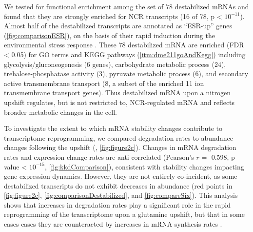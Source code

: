 We tested for
functional enrichment among the set of 78 destabilized
mRNAs and found that they are strongly enriched for NCR
transcripts (16 of 78, p < $10^{-11}$). Almost half of the
destabilized transcripts are annotated as “ESR-up” genes
(\autoref{fig:comparisonESR}), on the basis of  their rapid induction
during the environmental stress response \parencite{gasch2000genomic}. These 78
destabilized mRNA are enriched (FDR < 0.05) for GO terms and KEGG 
pathways (\autoref{itm:dme211goAndKegg}) including
glycolysis/gluconeogenesis (6 genes), 
carbohydrate metabolic process (24),
trehalose-phosphatase activity (3), 
pyruvate metabolic process (6), 
and secondary active transmembrane transport
(8, a subset of the enriched 11 ion transmembrane transport genes).
Thus destabilized mRNA upon a nitrogen upshift regulates, 
but is not restricted to, NCR-regulated mRNA and reflects broader
metabolic changes in the cell. 




To investigate the extent to which mRNA stability changes contribute
to transcriptome reprogramming, we compared degradation rates
to abundance changes following the upshift 
(\cite{airoldi2016steady}, \autoref{fig:figure2c}). 
Changes in mRNA degradation rates
and expression change rates are anti-correlated (Pearson's $r$ = -0.598,
p-value < $10^{-15}$, \autoref{fig:kkdComparison}),
consistent with stability changes impacting gene expression dynamics.
However, they are not entirely co-incident, as some destabilized
transcripts do not exhibit decreases in abundance (red points in
\autoref{fig:figure2c}, \autoref{fig:comparisonDestabilized},
and \autoref{fig:compareSix}).
This analysis shows that increases in degradation rates play a 
significant role
in the rapid reprogramming of the transcriptome upon a glutamine
upshift, but that in some cases cases they are counteracted by
increases in mRNA synthesis rates
\parencite{shalem2008transient,canadell2015impact}.

